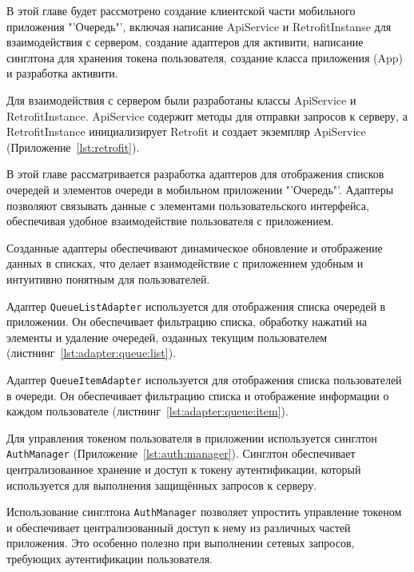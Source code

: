 

В этой главе будет рассмотрено создание клиентской части мобильного
приложения "'Очередь"', включая написание ApiService и RetrofitInstanse
для взаимодействия с сервером, создание адаптеров для активити,
написание синглтона для хранения токена пользователя,
создание класса приложения (App) и разработка активити.


Для взаимодействия с сервером были разработаны
классы ApiService и RetrofitInstance.
ApiService содержит методы для отправки запросов к серверу,
а RetrofitInstance инициализирует Retrofit и создает экземпляр ApiService
(Приложение~\ref{lst:retrofit}).


В этой главе рассматривается разработка адаптеров для отображения списков
очередей и элементов очереди в мобильном приложении "'Очередь"'.
Адаптеры позволяют связывать данные с элементами пользовательского интерфейса,
обеспечивая удобное взаимодействие пользователя с приложением.\par
Созданные адаптеры обеспечивают динамическое обновление и отображение данных
в списках, что делает взаимодействие с приложением удобным
и интуитивно понятным для пользователей.

Адаптер \texttt{QueueListAdapter} используется
для отображения списка очередей в приложении.
Он обеспечивает фильтрацию списка, обработку нажатий на элементы
и удаление очередей, озданных текущим пользователем
(листнинг~\ref{lst:adapter:queue:list}).

Адаптер \texttt{QueueItemAdapter} используется
для отображения списка пользователей в очереди.
Он обеспечивает фильтрацию списка и отображение информации
о каждом пользователе (листнинг~\ref{lst:adapter:queue:item}).


Для управления токеном пользователя
в приложении используется синглтон \texttt{AuthManager}
(Приложение~\ref{lst:auth:manager}).
Синглтон обеспечивает централизованное хранение
и доступ к токену аутентификации,
который используется для выполнения защищённых запросов к серверу.\par
Использование синглтона \texttt{AuthManager}
позволяет упростить управление токеном
и обеспечивает централизованный доступ к нему из различных частей приложения.
Это особенно полезно при выполнении сетевых запросов,
требующих аутентификации пользователя.

